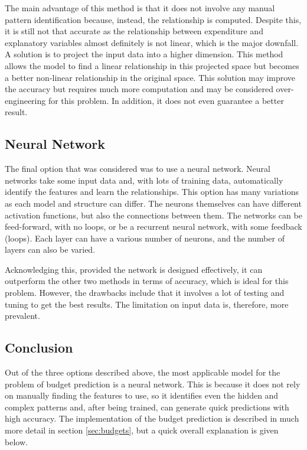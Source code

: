 The main advantage of this method is that it does not involve any manual pattern identification because, instead, the relationship is computed. Despite this, it is still not that accurate as the relationship between expenditure and explanatory variables almost definitely is not linear, which is the major downfall. A solution is to project the input data into a higher dimension. This method allows the model to find a linear relationship in this projected space but becomes a better non-linear relationship in the original space. This solution may improve the accuracy but requires much more computation and may be considered over-engineering for this problem. In addition, it does not even guarantee a better result.

\subsection{Neural Network}
The final option that was considered was to use a neural network. Neural networks take some input data and, with lots of training data, automatically identify the features and learn the relationships. This option has many variations as each model and structure can differ. The neurons themselves can have different activation functions, but also the connections between them. The networks can be feed-forward, with no loops, or be a recurrent neural network, with some feedback (loops). Each layer can have a various number of neurons, and the number of layers can also be varied.

Acknowledging this, provided the network is designed effectively, it can outperform the other two methods in terms of accuracy, which is ideal for this problem. However, the drawbacks include that it involves a lot of testing and tuning to get the best results. The limitation on input data is, therefore, more prevalent.

\subsection{Conclusion}
Out of the three options described above, the most applicable model for the problem of budget prediction is a neural network. This is because it does not rely on manually finding the features to use, so it identifies even the hidden and complex patterns and, after being trained, can generate quick predictions with high accuracy. The implementation of the budget prediction is described in much more detail in section \ref{sec:budgets}, but a quick overall explanation is given below.

